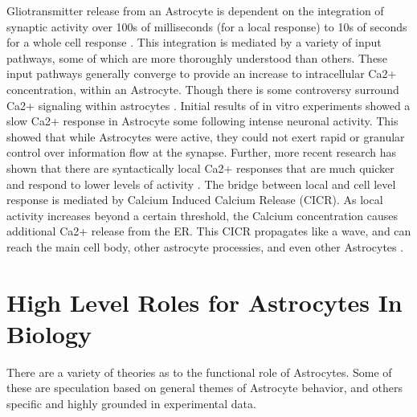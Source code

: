     Gliotransmitter release from an Astrocyte is dependent on the integration of
    synaptic activity over 100s of milliseconds (for a local response)
    \cite{pitta_2016} to 10s of seconds for a whole cell response
    \cite{mederos_2018}. This integration is mediated by a variety of input
    pathways, some of which are more thoroughly understood than others. These
    input pathways generally converge to provide an increase to intracellular
    Ca2+ concentration, within an Astrocyte. Though there is some controversy
    surround Ca2+ signaling within astrocytes \cite{mederos_2018}. Initial
    results of in vitro experiments showed a slow Ca2+ response in Astrocyte some
    following intense neuronal activity. This showed that while Astrocytes were
    active, they could not exert rapid or granular control over information flow
    at the synapse. Further, more recent research has shown that there are
    syntactically local Ca2+ responses that are much quicker and respond to
    lower levels of activity \cite{araque_2014}. The bridge between local and
    cell level response is mediated by Calcium Induced Calcium Release
    (CICR). As local activity increases beyond a certain threshold, the Calcium
    concentration causes additional Ca2+ release from the ER. This CICR
    propagates like a wave, and can reach the main cell body, other astrocyte
    processies, and even other Astrocytes \cite{manninen_2018}.


    \section{High Level Roles for Astrocytes In Biology}
    
    There are a variety of theories as to the functional role of Astrocytes.
    Some of these are speculation based on general themes of Astrocyte behavior,
    and others specific and highly grounded in experimental data.

